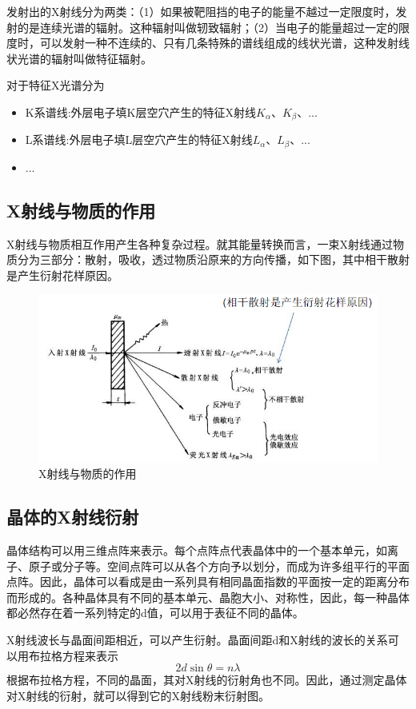 \documentclass[a4paper]{article}
\begin{document}
发射出的X射线分为两类：（1）如果被靶阻挡的电子的能量不越过一定限度时，发射的是连续光谱的辐射。这种辐射叫做轫致辐射；（2）当电子的能量超过一定的限度时，可以发射一种不连续的、只有几条特殊的谱线组成的线状光谱，这种发射线状光谱的辐射叫做特征辐射。

对于特征X光谱分为
\begin{itemize}
	\item K系谱线:外层电子填K层空穴产生的特征X射线$ K_\alpha $、$ K_\beta $、...
	\item L系谱线:外层电子填L层空穴产生的特征X射线$ L_\alpha $、$ L_\beta $、...
	\item ...
\end{itemize}
\subsection{X射线与物质的作用}
X射线与物质相互作用产生各种复杂过程。就其能量转换而言，一束X射线通过物质分为三部分：散射，吸收，透过物质沿原来的方向传播，如下图，其中相干散射是产生衍射花样原因。
\begin{figure}[H]
	\centering
	\includegraphics[width=0.7\linewidth]{fig/X2.jpg}
	\caption{X射线与物质的作用}
\end{figure}


\subsection{晶体的X射线衍射}
晶体结构可以用三维点阵来表示。每个点阵点代表晶体中的一个基本单元，如离子、原子或分子等。空间点阵可以从各个方向予以划分，而成为许多组平行的平面点阵。因此，晶体可以看成是由一系列具有相同晶面指数的平面按一定的距离分布而形成的。各种晶体具有不同的基本单元、晶胞大小、对称性，因此，每一种晶体都必然存在着一系列特定的d值，可以用于表征不同的晶体。

X射线波长与晶面间距相近，可以产生衍射。晶面间距d和X射线的波长的关系可以用布拉格方程来表示
\begin{equation}\label{key}
2d\sin\theta = n\lambda
\end{equation}
根据布拉格方程，不同的晶面，其对X射线的衍射角也不同。因此，通过测定晶体对X射线的衍射，就可以得到它的X射线粉末衍射图。%
\end{document}
